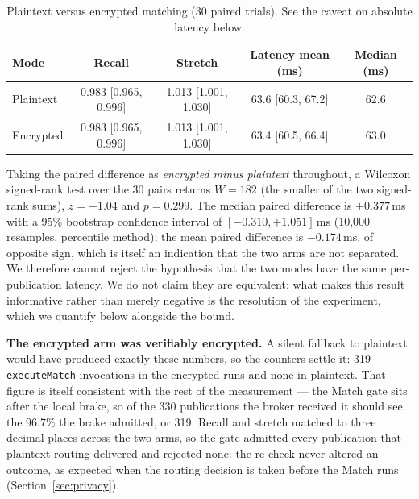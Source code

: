 \documentclass[10pt]{article}
\begin{document}
\begin{table}[t]
\centering
\caption{Plaintext versus encrypted matching (30 paired trials). See the caveat on absolute latency below.}
\label{tab:crypto-comparison}
\begin{tabular}{lcccc}
\toprule
Mode & Recall & Stretch & Latency mean (ms) & Median (ms) \\
\midrule
Plaintext & 0.983 [0.965, 0.996] & 1.013 [1.001, 1.030] & 63.6 [60.3, 67.2] & 62.6 \\
Encrypted & 0.983 [0.965, 0.996] & 1.013 [1.001, 1.030] & 63.4 [60.5, 66.4] & 63.0 \\
\bottomrule
\end{tabular}
\end{table}

Taking the paired difference as \emph{encrypted minus plaintext} throughout, a Wilcoxon signed-rank test over the 30 pairs returns $W = 182$ (the smaller of the two signed-rank sums), $z = -1.04$ and $p = 0.299$. The median paired difference is $+0.377$\,ms with a 95\% bootstrap confidence interval of $[-0.310, +1.051]$\,ms (10{,}000 resamples, percentile method); the mean paired difference is $-0.174$\,ms, of opposite sign, which is itself an indication that the two arms are not separated. We therefore cannot reject the hypothesis that the two modes have the same per-publication latency. We do not claim they are equivalent: what makes this result informative rather than merely negative is the resolution of the experiment, which we quantify below alongside the bound.

\textbf{The encrypted arm was verifiably encrypted.} A silent fallback to plaintext would have produced exactly these numbers, so the counters settle it: 319 \texttt{executeMatch} invocations in the encrypted runs and none in plaintext. That figure is itself consistent with the rest of the measurement --- the Match gate sits after the local brake, so of the 330 publications the broker received it should see the 96.7\% the brake admitted, or 319. Recall and stretch matched to three decimal places across the two arms, so the gate admitted every publication that plaintext routing delivered and rejected none: the re-check never altered an outcome, as expected when the routing decision is taken before the Match runs (Section~\ref{sec:privacy}).
\end{document}
